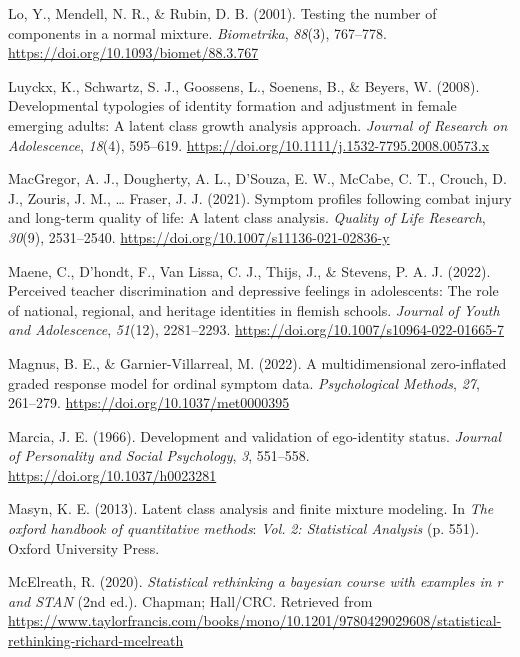 \documentclass[
  ,man,floatsintext]{apa6}
\newlength{\cslhangindent}
\newlength{\cslentryspacingunit} %
\newenvironment{CSLReferences}[2] %
 {%
  \setlength{\parindent}{0pt}
  \ifodd #1
  \let\oldpar\par
  \def\par{\hangindent=\cslhangindent\oldpar}
  \fi
  \setlength{\parskip}{#2\cslentryspacingunit}
 }%
 {}
\begin{document}
\begin{CSLReferences}{1}{0}
\leavevmode{}%
Lo, Y., Mendell, N. R., \& Rubin, D. B. (2001). Testing the number of components in a normal mixture. \emph{Biometrika}, \emph{88}(3), 767--778. \url{https://doi.org/10.1093/biomet/88.3.767}

\leavevmode{}%
Luyckx, K., Schwartz, S. J., Goossens, L., Soenens, B., \& Beyers, W. (2008). Developmental typologies of identity formation and adjustment in female emerging adults: A latent class growth analysis approach. \emph{Journal of Research on Adolescence}, \emph{18}(4), 595--619. \url{https://doi.org/10.1111/j.1532-7795.2008.00573.x}

\leavevmode{}%
MacGregor, A. J., Dougherty, A. L., D'Souza, E. W., McCabe, C. T., Crouch, D. J., Zouris, J. M., \ldots{} Fraser, J. J. (2021). Symptom profiles following combat injury and long-term quality of life: A latent class analysis. \emph{Quality of Life Research}, \emph{30}(9), 2531--2540. \url{https://doi.org/10.1007/s11136-021-02836-y}

\leavevmode{}%
Maene, C., D'hondt, F., Van Lissa, C. J., Thijs, J., \& Stevens, P. A. J. (2022). Perceived teacher discrimination and depressive feelings in adolescents: The role of national, regional, and heritage identities in flemish schools. \emph{Journal of Youth and Adolescence}, \emph{51}(12), 2281--2293. \url{https://doi.org/10.1007/s10964-022-01665-7}

\leavevmode{}%
Magnus, B. E., \& Garnier-Villarreal, M. (2022). A multidimensional zero-inflated graded response model for ordinal symptom data. \emph{Psychological Methods}, \emph{27}, 261--279. \url{https://doi.org/10.1037/met0000395}

\leavevmode{}%
Marcia, J. E. (1966). Development and validation of ego-identity status. \emph{Journal of Personality and Social Psychology}, \emph{3}, 551--558. \url{https://doi.org/10.1037/h0023281}

\leavevmode{}%
Masyn, K. E. (2013). Latent class analysis and finite mixture modeling. In \emph{The oxford handbook of quantitative methods}: \emph{Vol.} \emph{2: Statistical Analysis} (p. 551). Oxford University Press.

\leavevmode{}%
McElreath, R. (2020). \emph{Statistical rethinking {\textbar} a bayesian course with examples in r and {STAN}} (2nd ed.). Chapman; Hall/{CRC}. Retrieved from \url{https://www.taylorfrancis.com/books/mono/10.1201/9780429029608/statistical-rethinking-richard-mcelreath}


\end{CSLReferences}
\end{document}
